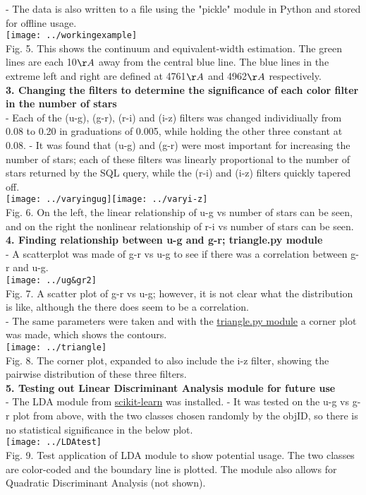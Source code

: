 \documentclass[12pt]{article}
\begin{document}
- The data is also written to a file using the "pickle" module in Python and stored for offline usage. \\
\texttt{[image: ../workingexample]}\\
Fig. 5. This shows the continuum and equivalent-width estimation. The green lines are each 10$\AA$  away from the central blue line. The blue lines in the extreme left and right are defined at 4761$\AA$ and 4962$\AA$  respectively. \\
\textbf{3. Changing the filters to determine the significance of each color filter in the number of stars	}\\
- Each of the (u-g), (g-r), (r-i) and (i-z) filters was changed individiually from 0.08 to 0.20 in graduations of 0.005, while holding the other three constant at 0.08. 
- It was found that (u-g) and (g-r) were most important for increasing the number of stars; each of these filters was linearly proportional to the number of stars returned by the SQL query, while the (r-i) and (i-z) filters quickly tapered off. \\
\texttt{[image: ../varyingug]}\texttt{[image: ../varyi-z]}\\
Fig. 6. On the left, the linear relationship of u-g vs number of stars can be seen, and on the right the nonlinear relationship of r-i vs number of stars can be seen.\\
\textbf{4. Finding relationship between u-g and g-r; triangle.py module}\\
- A scatterplot was made of g-r vs u-g to see if there was a correlation between g-r and u-g. \\
\texttt{[image: ../ug\&gr2]}\\
Fig. 7. A scatter plot of g-r vs u-g; however, it is not clear what the distribution is like, although the there does seem to be a correlation.\\
- The same parameters were taken and with the \href{https://github.com/dfm/triangle.py}{triangle.py module} a corner plot was made, which shows the contours.\\
\texttt{[image: ../triangle]}\\
Fig. 8. The corner plot, expanded to also include the i-z filter, showing the pairwise distribution of these three filters.\\
\textbf{5. Testing out Linear Discriminant Analysis module for future use}\\
- The LDA module from \href{http://scikit-learn.org/stable/install.html}{scikit-learn} was installed.
- It was tested on the u-g vs g-r plot from above, with the two classes chosen randomly by the objID, so there is no statistical significance in the below plot.\\
\texttt{[image: ../LDAtest]}\\
Fig. 9. Test application of LDA module to show potential usage. The two classes are color-coded and the boundary line is plotted. The module also allows for Quadratic Discriminant Analysis (not shown).\\
\end{document}
